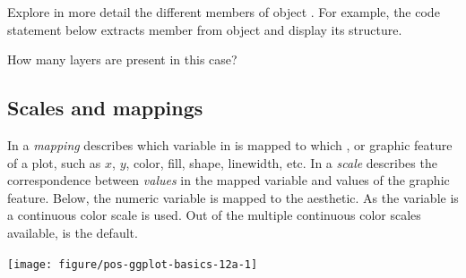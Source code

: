 \documentclass[krantz2]{krantz}\usepackage{knitr}
\begin{document}
\begin{advplayground}
Explore in more detail the different members of object . For example, the code statement below extracts member  from object  and display its structure.

\begin{knitrout}\footnotesize
{}\color{fgcolor}\begin{kframe}
\begin{alltt}
\hlopt{$}  \hlstd{=} \hlstd{)}
\end{alltt}
\end{kframe}
\end{knitrout}

How many layers are present in this case?
\end{advplayground}

\subsection{Scales and mappings}\label{sec:plot:mappings}
In \ggplot a \emph{mapping} describes which variable in  is mapped to which ,  or graphic feature of a plot, such as $x$, $y$, color, fill, shape, linewidth, etc. In \ggplot a \emph{scale} describes the correspondence between \emph{values} in the mapped variable and values of the graphic feature. Below, the numeric variable  is mapped to the  aesthetic. As the variable is  a continuous color scale is used. Out of the multiple continuous color scales available,  is the default.

\begin{knitrout}\footnotesize
{}\color{fgcolor}\begin{kframe}
\begin{alltt}
 \hlkwb{<-}
  \hlstd{(} 
          \hlstd{=} \hlstd{(}      \hlopt{+}
  \hlstd{()}
\end{alltt}
\end{kframe}

{\centering \texttt{[image: figure/pos-ggplot-basics-12a-1]} 

}


\end{knitrout}
\end{document}
